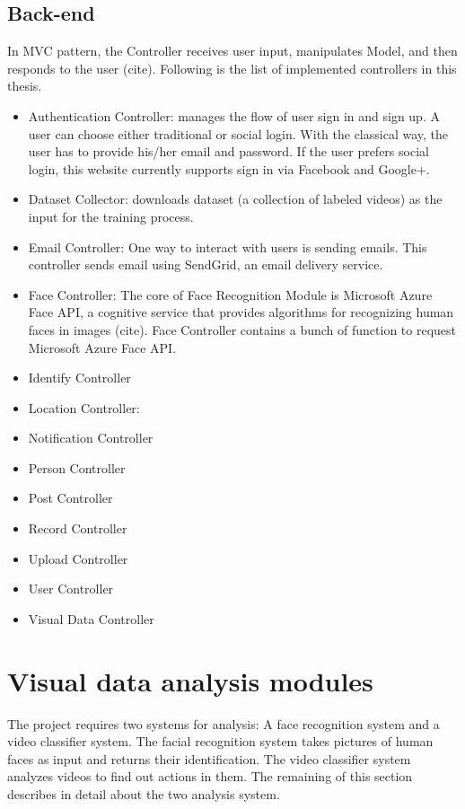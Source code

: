\subsection{Back-end}
In MVC pattern, the Controller receives user input, manipulates Model, and then responds to the user (cite). Following is the list of implemented controllers in this thesis.
\begin{itemize}
	\item Authentication Controller: manages the flow of user sign in and sign up. A user can choose either traditional or social login. With the classical way, the user has to provide his/her email and password. If the user prefers social login, this website currently supports sign in via Facebook and Google+.
	\item Dataset Collector: downloads dataset (a collection of labeled videos) as the input for the training process.
	\item Email Controller: One way to interact with users is sending emails. This controller sends email using SendGrid, an email delivery service.
	\item Face Controller: The core of Face Recognition Module is Microsoft Azure Face API, a cognitive service that provides algorithms for recognizing human faces in images (cite). Face Controller contains a bunch of function to request Microsoft Azure Face API.
	\item Identify Controller
	\item Location Controller: 
	\item Notification Controller
	\item Person Controller
	\item Post Controller
	\item Record Controller
	\item Upload Controller
	\item User Controller
	\item Visual Data Controller
	      
\end{itemize}
\section{Visual data analysis modules}
The project requires two systems for analysis: A face recognition system and a video classifier system. The facial recognition system takes pictures of human faces as input and returns their identification. The video classifier system analyzes videos to find out actions in them. The remaining of this section describes in detail about the two analysis system.
